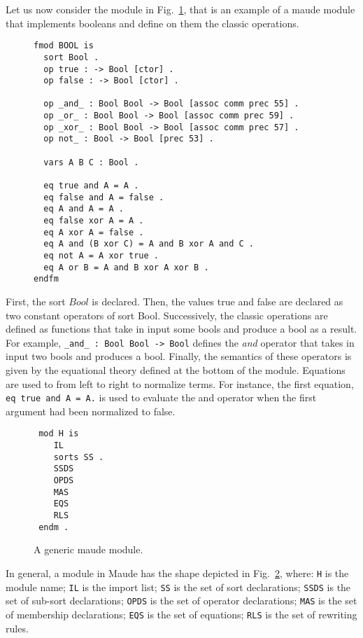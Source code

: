 \documentclass{article}[12pt,a4paper]
\theoremstyle{definition}
\begin{document}
Let us now consider the module in Fig.~\ref{fig:bool}, that is an example of a maude module that implements booleans and
define on them the classic operations.

\begin{figure}[t]
\begin{verbatim}
fmod BOOL is
  sort Bool .
  op true : -> Bool [ctor] .
  op false : -> Bool [ctor] .

  op _and_ : Bool Bool -> Bool [assoc comm prec 55] .
  op _or_ : Bool Bool -> Bool [assoc comm prec 59] .
  op _xor_ : Bool Bool -> Bool [assoc comm prec 57] .
  op not_ : Bool -> Bool [prec 53] .

  vars A B C : Bool .

  eq true and A = A .
  eq false and A = false .
  eq A and A = A .
  eq false xor A = A .
  eq A xor A = false .
  eq A and (B xor C) = A and B xor A and C .
  eq not A = A xor true .
  eq A or B = A and B xor A xor B .
endfm
\end{verbatim}
  \label{fig:bool}
\end{figure}

First, the sort $Bool$ is declared. Then, the values true and false are declared
as two constant operators of sort Bool. Successively, the classic operations are
defined as functions that take in input some bools and produce a bool as a
result. For example, \verb+_and_ : Bool Bool -> Bool+ defines the \emph{and}
operator that takes in input two bools and produces a bool. Finally, the semantics of these operators is given
by the equational theory defined at the bottom of the module. Equations are used
to from left to right to normalize terms. For instance, the first equation,
\verb+eq true and A = A.+ is used to evaluate the and operator when the first
argument had been normalized to false.


\begin{figure}[t]
\begin{verbatim}
 mod H is
    IL
    sorts SS .
    SSDS
    OPDS
    MAS
    EQS
    RLS
 endm .
\end{verbatim}
  
  \caption{A generic maude module.}
  \label{fig:maude-module}
\end{figure}

In general, a module in Maude has the shape depicted in Fig.~\ref{fig:maude-module}, where:
\verb+H+ is the module name; \verb+IL+ is the import list; \verb+SS+ is the set
of sort declarations; \verb+SSDS+ is the set of sub-sort declarations; \verb+OPDS+
is the set of operator declarations; \verb+MAS+ is the set of membership
declarations; \verb+EQS+ is the set of equations; \verb+RLS+ is the set of
rewriting rules. 
\end{document}
